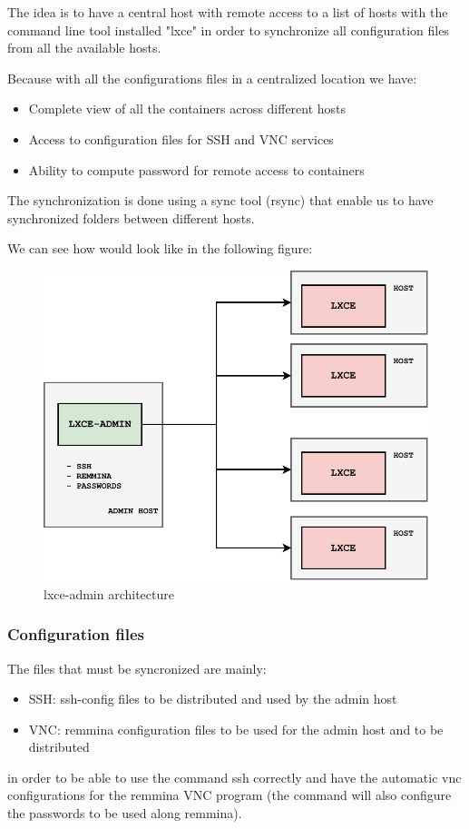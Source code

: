 The idea is to have a central host with remote access to a list of hosts with the command line tool installed "lxce" in order to synchronize all configuration files from all the available hosts. 

Because with all the configurations files in a centralized location we have:
\begin{itemize}
	\item{Complete view of all the containers across different hosts}
	\item{Access to configuration files for SSH and VNC services}
	\item{Ability to compute password for remote access to containers}
\end{itemize}

The synchronization is done using a sync tool (rsync) that enable us to have synchronized folders between different hosts.

We can see how would look like in the following figure:
\begin{figure}[H]
	\label{fig:LXCE-ADMIN architecture}
	\centering
	\includegraphics{img/03/lxce-admin-diagram.pdf}
	\caption[LXCE-ADMIN block diagram]{\footnotesize{lxce-admin architecture}}
\end{figure}


\subsubsection{Configuration files}
The files that must be syncronized are mainly:
\begin{itemize}
	\item{SSH: ssh-config files to be distributed and used by the admin host}
	\item{VNC: remmina configuration files to be used for the admin host and to be distributed}
\end{itemize}
in order to be able to use the command ssh correctly and have the automatic vnc configurations for the remmina VNC program (the command will also configure the passwords to be used along remmina).



